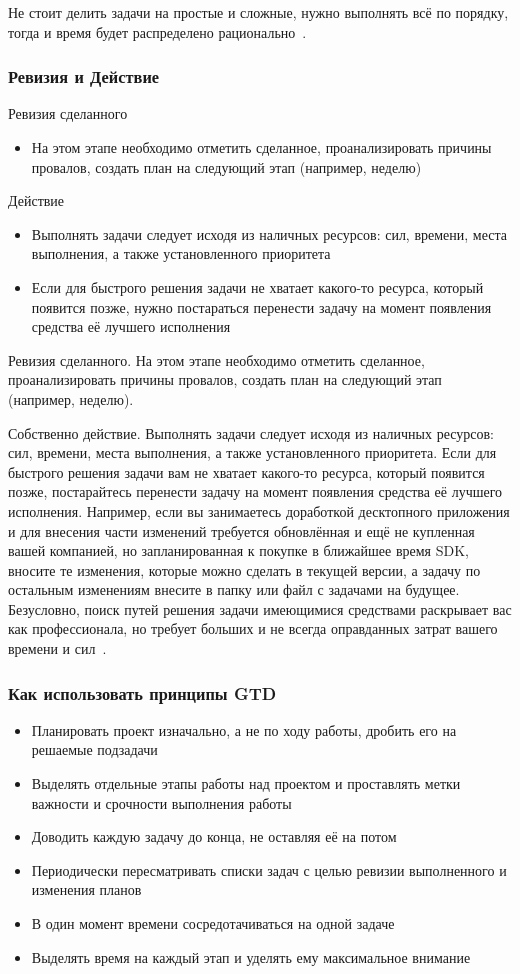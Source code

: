 \documentclass{../industrial-development}
\begin{document}
Не стоит делить задачи на простые и сложные, нужно выполнять всё по порядку, тогда и время будет распределено рационально~\cite{GTDHabr}. 

\begin{frame} \frametitle{Ревизия и Действие}
Ревизия сделанного
  \begin{itemize}
  \item На этом этапе необходимо отметить сделанное, проанализировать причины провалов, создать план на следующий этап (например, неделю)
  \end{itemize}
Действие
  \begin{itemize}
  \item Выполнять задачи следует исходя из наличных ресурсов: сил, времени, места выполнения, а также установленного приоритета
  \item Если для быстрого решения задачи не хватает какого-то ресурса, который появится позже, нужно постараться перенести задачу на момент появления средства её лучшего исполнения
  \end{itemize}
\end{frame}

\lecturenotes

Ревизия сделанного. На этом этапе необходимо отметить сделанное, проанализировать причины провалов, создать план на следующий этап (например, неделю).

Собственно действие. Выполнять задачи следует исходя из наличных ресурсов: сил, времени, места выполнения, а также установленного приоритета. Если для быстрого решения задачи вам не хватает какого-то ресурса, который появится позже, постарайтесь перенести задачу на момент появления средства её лучшего исполнения. Например, если вы занимаетесь доработкой десктопного приложения и для внесения части изменений требуется обновлённая и ещё не купленная вашей компанией, но запланированная к покупке в ближайшее время SDK, вносите те изменения, которые можно сделать в текущей версии, а задачу по остальным изменениям внесите в папку или файл с задачами на будущее. Безусловно, поиск путей решения задачи имеющимися средствами раскрывает вас как профессионала, но требует больших и не всегда оправданных затрат вашего времени и сил~\cite{GTDHabr}.

\begin{frame} \frametitle{Как использовать принципы GTD}
  \begin{itemize}
  \item Планировать проект изначально, а не по ходу работы, дробить его на решаемые подзадачи
  \item Выделять отдельные этапы работы над проектом и проставлять метки важности и срочности выполнения работы
  \item Доводить каждую задачу до конца, не оставляя её на потом
  \item Периодически пересматривать списки задач с целью ревизии выполненного и изменения планов
  \item В один момент времени сосредотачиваться на одной задаче
  \item Выделять время на каждый этап и уделять ему максимальное внимание
  \end{itemize}
\end{frame}
\end{document}
